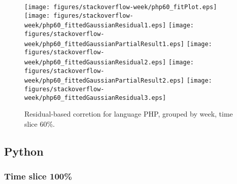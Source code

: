 \begin{figure}[hb]
\centering
{}
{\texttt{[image: figures/stackoverflow-week/php60\_fitPlot.eps]}}
{\texttt{[image: figures/stackoverflow-week/php60\_fittedGaussianResidual1.eps]}}
{\texttt{[image: figures/stackoverflow-week/php60\_fittedGaussianPartialResult1.eps]}}
{\texttt{[image: figures/stackoverflow-week/php60\_fittedGaussianResidual2.eps]}}
{\texttt{[image: figures/stackoverflow-week/php60\_fittedGaussianPartialResult2.eps]}}
{\texttt{[image: figures/stackoverflow-week/php60\_fittedGaussianResidual3.eps]}}
\caption{Residual-based corretion for language PHP, grouped by week, time slice 60\%.}
\end{figure}


\clearpage 
\newpage 


\subsection{Python}

\FloatBarrier

\subsubsection{Time slice 100\%}

